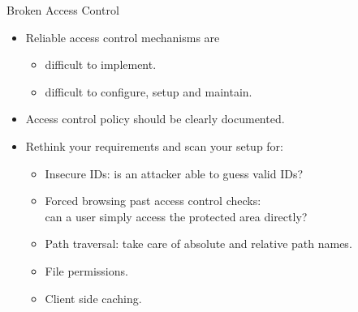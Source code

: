 \documentclass{beamer}
\begin{document}
\begin{printout}
\begin{slide}{Broken Access Control}
  \begin{itemize}\itemsep=1ex
    \item Reliable access control mechanisms are
    \begin{itemize}\itemsep=1ex
      \item difficult to implement.
      \item difficult to configure, setup and maintain.
    \end{itemize}
      \item Access control policy should be clearly documented.
      \item Rethink your requirements and scan your setup for:
    \begin{itemize}\itemsep=1.5ex
      \item Insecure IDs: is an attacker able to guess valid IDs?
      \item Forced browsing past access control checks: \\
            can a user simply access the protected area directly?
      \item Path traversal: take care of absolute and relative path names.
      \item File permissions.
      \item Client side caching.
    \end{itemize}
  \end{itemize}
\end{slide}
\end{printout}
\end{document}

